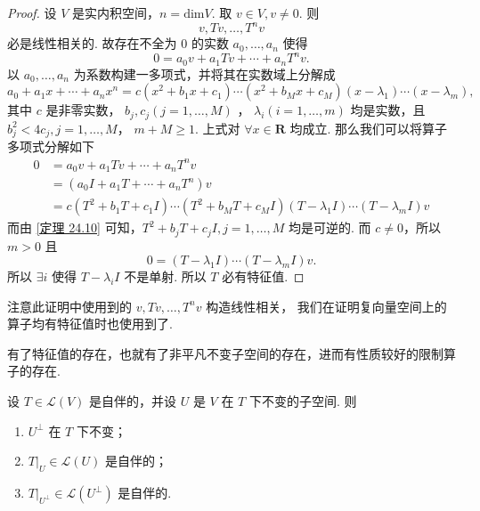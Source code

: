 \begin{proof}
    设 $ V $ 是实内积空间，$ n = \mathrm{dim} V $. 取 $ v \in V, v \neq 0 $. 则
    \[
        v, Tv, \ldots , T^nv    
    \]
    必是线性相关的. 故存在不全为 0 的实数 $ a_0, \ldots , a_n $ 使得
    \[
        0 = a_0v + a_1Tv + \cdots + a_nT^nv.    
    \]
    以 $ a_0, \ldots , a_n $ 为系数构建一多项式，并将其在实数域上分解成
    \[
        a_0 + a_1x + \cdots + a_nx^n  = c(x^2 + b_1x + c_1)\cdots(x^2 + b_Mx + c_M)
                            (x - \lambda_1)\cdots(x - \lambda_m),
    \]
    其中 $ c $ 是非零实数， $ b_j, c_j (j = 1, \ldots , M) $ ，
    $ \lambda_i (i = 1, \ldots , m) $ 均是实数，且 $ b_j^2 < 4c_j , j = 1, \ldots , M $，
    $ m + M \geqslant 1 $. 上式对 $ \forall x \in \mathbf{R} $ 均成立. 那么我们可以将算子多项式分解如下
    \begin{align*}
         0 & = a_0v + a_1Tv + \cdots + a_nT^nv \\
           & = (a_0I + a_1T + \cdots + a_nT^n)v \\
           & = c(T^2 + b_1T + c_1I)\cdots(T^2 + b_MT + c_MI)
           (T - \lambda_1I)\cdots(T - \lambda_mI)v
    \end{align*}
    而由 \ref{定理 24.10} 可知，$ T^2 + b_jT + c_jI, j = 1, \ldots , M $ 均是可逆的. 
    而 $ c \neq 0 $，所以 $ m > 0 $ 且
    \[
         0 = (T - \lambda_1I)\cdots(T - \lambda_mI)v. 
    \]
    所以 $ \exists i $ 使得 $ T - \lambda_iI $ 不是单射. 所以 $ T $ 必有特征值.  
\end{proof}

注意此证明中使用到的 $ v, Tv, \ldots , T^nv $ 构造线性相关，
我们在证明复向量空间上的算子均有特征值时也使用到了. 

有了特征值的存在，也就有了非平凡不变子空间的存在，进而有性质较好的限制算子的存在. 

\begin{theorem}
    设 $ T \in \mathcal{L}(V) $ 是自伴的，并设 $ U $ 是 $ V $ 在 $ T $ 下不变的子空间. 则
    \begin{enumerate}
        \item $ U^{\perp} $ 在 $ T $ 下不变；
        
        \item $ T|_U \in \mathcal{L}(U) $ 是自伴的；
        
        \item $ T|_{U^{\perp }} \in \mathcal{L}(U^{\perp }) $ 是自伴的. 
    \end{enumerate} 
\end{theorem}

